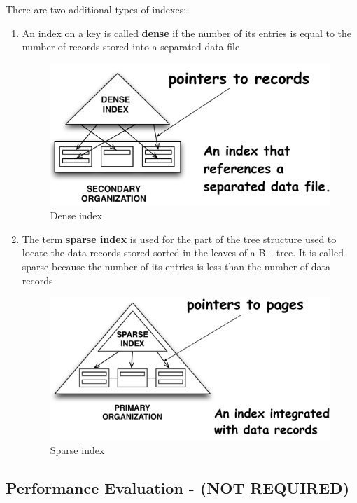 There are two additional types of indexes:
\begin{enumerate}
    \item An index on a key is called \textbf{dense} if the number of its entries is equal to the number of records stored into a separated data file
    \begin{figure}[!h]
    \centering
    \includegraphics[width=0.5\linewidth]{images/DBMS_Internals/DynamicTreeStructureOrganizations/dense_index.jpeg}
    \caption{Dense index}
\end{figure}
    \item The term \textbf{sparse index} is used for the part of the tree structure used to locate the data records stored sorted in the leaves of a B+-tree. It is called sparse because the number of its entries is less than the number of data records
    \begin{figure}[!h]
    \centering
    \includegraphics[width=0.5\linewidth]{images/DBMS_Internals/DynamicTreeStructureOrganizations/sparse_index.jpeg}
    \caption{Sparse index}
\end{figure}
\end{enumerate}


\subsection{Performance Evaluation - (NOT REQUIRED)}

